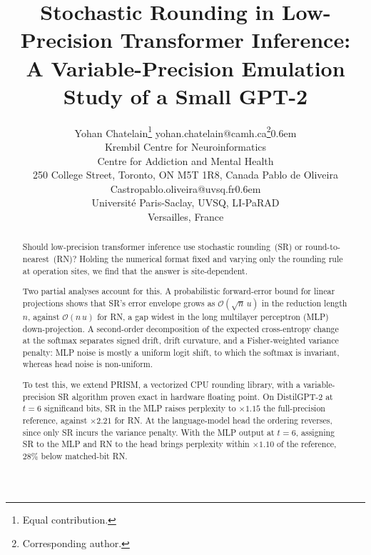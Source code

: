 \documentclass[twoside,11pt]{article}
\begin{document}
\title{Stochastic Rounding in Low-Precision Transformer Inference:\\
  A Variable-Precision Emulation Study of a Small GPT-2}

\author{\name Yohan Chatelain\thanks{Equal contribution.} \email yohan.chatelain@camh.ca\thanks{Corresponding author.}\kern0.6em \\
  \addr Krembil Centre for Neuroinformatics\\
  Centre for Addiction and Mental Health\\
  250 College Street, Toronto, ON M5T 1R8, Canada
  \AND
  \name Pablo de Oliveira Castro\footnotemark[1] \email pablo.oliveira@uvsq.fr\kern0.6em \\
  \addr Universit\'e Paris-Saclay, UVSQ, LI-PaRAD\\
  Versailles, France}

\editor{}

\maketitle

\begin{abstract}%
  Should low-precision transformer inference use stochastic rounding~(SR) or
  round-to-nearest~(RN)? Holding the numerical format fixed and varying only the
  rounding rule at operation sites, we find that the answer is site-dependent.

  Two partial analyses account for this. A probabilistic forward-error bound
  for linear projections shows that SR's error envelope grows as
  $\mathcal{O}(\sqrt{n}\,u)$ in the reduction length $n$, against
  $\mathcal{O}(n\,u)$ for RN, a gap widest in the long multilayer perceptron
  (MLP) down-projection. A second-order decomposition of the expected
  cross-entropy change at the softmax separates signed drift, drift curvature,
  and a Fisher-weighted variance penalty: MLP noise is mostly a uniform logit
  shift, to which the softmax is invariant, whereas head noise is non-uniform.

  To test this, we extend PRISM, a vectorized CPU rounding library, with a
  variable-precision SR algorithm proven exact in hardware floating point. On
  DistilGPT-2 at \(t=6\) significand bits, SR in the MLP raises perplexity to
  $\times1.15$ the full-precision reference, against $\times2.21$ for RN. At
  the language-model head the ordering reverses, since only SR incurs the
  variance penalty. With the MLP output at $t=6$, assigning SR to the MLP and
  RN to the head brings perplexity within $\times1.10$ of the reference, $28\%$
  below matched-bit RN.
\end{abstract}
\end{document}
